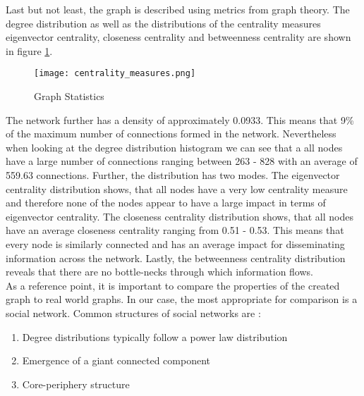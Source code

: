   \noindent Last but not least, the graph is described using metrics from graph
  theory. The degree distribution as well as the distributions of the 
  centrality measures eigenvector centrality, closeness centrality and 
  betweenness centrality are shown in figure \ref{fig:centrality_measures}.

  \begin{figure}[h]
	  \centering
	  \texttt{[image: centrality\_measures.png]}
	  \caption{Graph Statistics}
      \label{fig:centrality_measures}
  \end{figure}

  \noindent The network further has a density of approximately 0.0933. This
  means that 9\% of the maximum number of connections formed in the network.
  Nevertheless when looking at the degree distribution histogram we can see 
  that a all nodes have a large number of connections ranging between 263 -
  828 with an average of 559.63 connections. Further, the distribution has two
  modes. The eigenvector centrality distribution shows, that all nodes have a
  very low centrality measure and therefore none of the nodes appear to have a
  large impact in terms of eigenvector centrality. The closeness centrality
  distribution shows, that all nodes have an average closeness centrality
  ranging from 0.51 - 0.53. This means that every node is similarly connected
  and has an average impact for disseminating information across the network.
  Lastly, the betweenness centrality distribution reveals that there are no
  bottle-necks through which information flows. \\

  \noindent As a reference point, it is important to compare the properties of
  the created graph to real world graphs. In our case, the most appropriate for
  comparison is a social network. Common structures of social networks are
  \citep{watts1998collective,newman2006structure,Newman2010,
  kim2012multiplicative}:

  \begin{enumerate}
    \item Degree distributions typically follow a power law distribution
    \item Emergence of a giant connected component
    \item Core-periphery structure
  \end{enumerate}

